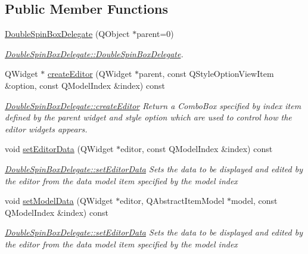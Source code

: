 \subsection*{Public Member Functions}
\begin{DoxyCompactItemize}
\item 
\hyperlink{classGui_1_1Widgets_1_1Delegates_1_1DoubleSpinBoxDelegate_a6d7df575ca17247028df99296fd2cf88}{Double\+Spin\+Box\+Delegate} (Q\+Object $\ast$parent=0)
\begin{DoxyCompactList}\small\item\em \hyperlink{classGui_1_1Widgets_1_1Delegates_1_1DoubleSpinBoxDelegate_a6d7df575ca17247028df99296fd2cf88}{Double\+Spin\+Box\+Delegate\+::\+Double\+Spin\+Box\+Delegate}. \end{DoxyCompactList}\item 
Q\+Widget $\ast$ \hyperlink{classGui_1_1Widgets_1_1Delegates_1_1DoubleSpinBoxDelegate_a681be1ef9cc0db4e315bc2cb8f7690be}{create\+Editor} (Q\+Widget $\ast$parent, const Q\+Style\+Option\+View\+Item \&option, const Q\+Model\+Index \&index) const 
\begin{DoxyCompactList}\small\item\em \hyperlink{classGui_1_1Widgets_1_1Delegates_1_1DoubleSpinBoxDelegate_a681be1ef9cc0db4e315bc2cb8f7690be}{Double\+Spin\+Box\+Delegate\+::create\+Editor} Return a Combo\+Box specified by {\itshape index} item defined by the {\itshape parent} widget and style {\itshape option} which are used to control how the editor widgets appears. \end{DoxyCompactList}\item 
void \hyperlink{classGui_1_1Widgets_1_1Delegates_1_1DoubleSpinBoxDelegate_a60bb2e12c0b0398c74d0e8c95304d7e4}{set\+Editor\+Data} (Q\+Widget $\ast$editor, const Q\+Model\+Index \&index) const 
\begin{DoxyCompactList}\small\item\em \hyperlink{classGui_1_1Widgets_1_1Delegates_1_1DoubleSpinBoxDelegate_a60bb2e12c0b0398c74d0e8c95304d7e4}{Double\+Spin\+Box\+Delegate\+::set\+Editor\+Data} Sets the data to be displayed and edited by the {\itshape editor} from the data model item specified by the model {\itshape index} \end{DoxyCompactList}\item 
void \hyperlink{classGui_1_1Widgets_1_1Delegates_1_1DoubleSpinBoxDelegate_a9c07f33b62b05f64979f52e9fead2553}{set\+Model\+Data} (Q\+Widget $\ast$editor, Q\+Abstract\+Item\+Model $\ast$model, const Q\+Model\+Index \&index) const 
\begin{DoxyCompactList}\small\item\em \hyperlink{classGui_1_1Widgets_1_1Delegates_1_1DoubleSpinBoxDelegate_a60bb2e12c0b0398c74d0e8c95304d7e4}{Double\+Spin\+Box\+Delegate\+::set\+Editor\+Data} Sets the data to be displayed and edited by the {\itshape editor} from the data model item specified by the model {\itshape index} \end{DoxyCompactList}\item 

\end{DoxyCompactItemize}
